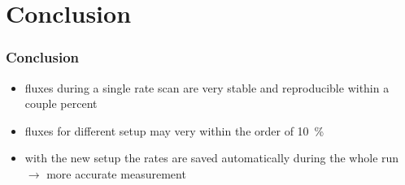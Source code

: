 \documentclass[9pt]{beamer}
\begin{document}
\section{Conclusion}
\begin{frame}
	\frametitle{Conclusion}
	\begin{minipage}[c][.3\textheight]{\textwidth}
		\begin{itemize}
			\setlength{\itemsep}{\fill}
			\item fluxes during a single rate scan are very stable and reproducible within a couple percent
			\item fluxes for different setup may very within the order of \SI{10}{\%}
			\item with the new setup the rates are saved automatically during the whole run $\longrightarrow$ more accurate measurement
		\end{itemize}
	\end{minipage}
\end{frame}
\end{document}

